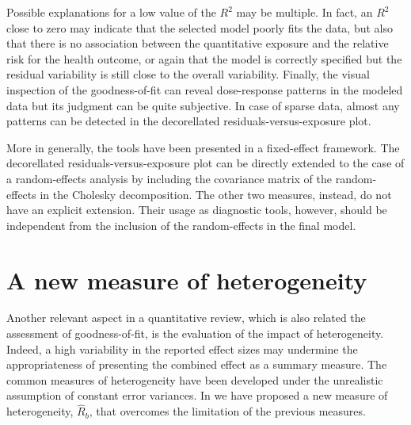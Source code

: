 \documentclass[11pt,a4paper,twoside,openany]{book}\usepackage{knitr}
\begin{document}
{Possible explanations for a low value of the $R^2$ may be multiple. In fact, an $R^2$ close to zero may indicate that the selected model poorly fits the data, but also that there is no association between the quantitative exposure and the relative risk for the health outcome, or again that the model is correctly specified but the residual variability is still close to the overall variability. Finally, the visual inspection of the goodness-of-fit can reveal dose-response patterns in the modeled data but its judgment can be quite subjective. In case of sparse data, almost any patterns can be detected in the decorellated residuals-versus-exposure plot.

More in generally, the tools have been presented in a fixed-effect framework. The decorellated residuals-versus-exposure plot can be directly extended to the case of a random-effects analysis by including the covariance matrix of the random-effects in the Cholesky decomposition. The other two measures, instead, do not have an explicit extension. Their usage as diagnostic tools, however, should be independent from the inclusion of the random-effects in the final model.


\section{A new measure of heterogeneity}

Another relevant aspect in a quantitative review, which is also related the assessment of goodness-of-fit, is the evaluation of the impact of heterogeneity. Indeed, a high variability in the reported effect sizes may undermine the appropriateness of presenting the combined effect as a summary measure. The common measures of heterogeneity have been developed under the unrealistic assumption of constant error variances. In  we have proposed a new measure of heterogeneity, $\hat R_b$, that overcomes the limitation of the previous measures.

}
\end{document}
